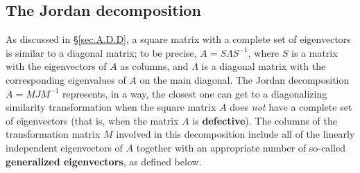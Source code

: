 \begin{figure*}[t!]
\end{figure*}





\subsection{The Jordan decomposition}\label{sec.A.D.H}

As discussed in \S \ref{sec.A.D.D},
a square matrix with a complete set of eigenvectors is similar to a diagonal matrix; to be precise, $A=S\Lambda S^{-1}$, where $S$
is a matrix with the eigenvectors of $A$ as columns, and $\Lambda$ is a diagonal matrix with the corresponding eigenvalues of $A$ on the
main diagonal. The Jordan decomposition $A=MJM^{-1}$ represents, in a way, the closest one can get to a diagonalizing
similarity transformation when the square matrix $A$ does {\it not} have a complete
set of eigenvectors (that is, when the matrix $A$ is {\bf defective}).  The columns of the transformation matrix $M$ involved in this
decomposition include all of the linearly independent eigenvectors of $A$ together with an appropriate number of 
so-called {\bf generalized eigenvectors}, as defined below.

